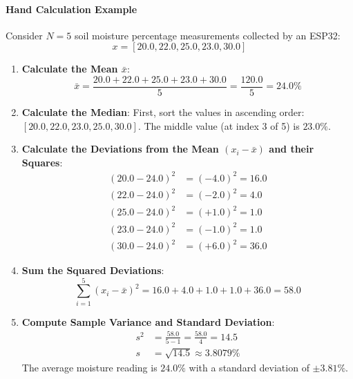 \paragraph{Hand Calculation Example}
Consider $N = 5$ soil moisture percentage measurements collected by an ESP32:
\begin{equation*}
x = [20.0, 22.0, 25.0, 23.0, 30.0]
\end{equation*}
\begin{enumerate}
    \item \textbf{Calculate the Mean $\bar{x}$}:
    \begin{equation*}
    \bar{x} = \frac{20.0 + 22.0 + 25.0 + 23.0 + 30.0}{5} = \frac{120.0}{5} = 24.0\%
    \end{equation*}
    \item \textbf{Calculate the Median}:
    First, sort the values in ascending order: $[20.0, 22.0, \mathbf{23.0}, 25.0, 30.0]$.
    The middle value (at index 3 of 5) is $\mathbf{23.0\%}$.
    \item \textbf{Calculate the Deviations from the Mean $(x_i - \bar{x})$ and their Squares}:
    \begin{align*}
    (20.0 - 24.0)^2 &= (-4.0)^2 = 16.0 \\
    (22.0 - 24.0)^2 &= (-2.0)^2 = 4.0 \\
    (25.0 - 24.0)^2 &= (+1.0)^2 = 1.0 \\
    (23.0 - 24.0)^2 &= (-1.0)^2 = 1.0 \\
    (30.0 - 24.0)^2 &= (+6.0)^2 = 36.0
    \end{align*}
    \item \textbf{Sum the Squared Deviations}:
    \begin{equation*}
    \sum_{i=1}^5 (x_i - \bar{x})^2 = 16.0 + 4.0 + 1.0 + 1.0 + 36.0 = 58.0
    \end{equation*}
    \item \textbf{Compute Sample Variance and Standard Deviation}:
    \begin{align*}
    s^2 &= \frac{58.0}{5 - 1} = \frac{58.0}{4} = 14.5 \\
    s &= \sqrt{14.5} \approx 3.8079\%
    \end{align*}
    The average moisture reading is $24.0\%$ with a standard deviation of $\pm 3.81\%$.
\end{enumerate}

